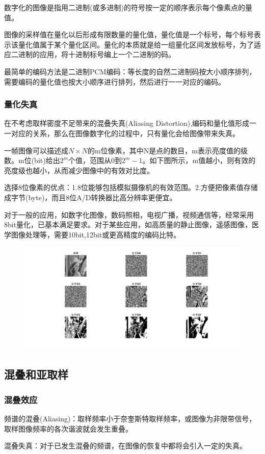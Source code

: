 \documentclass[11pt]{article}
\begin{document}
数字化的图像是指用二进制(或多进制)的符号按一定的顺序表示每个像素点的量值。

图像的采样值在量化以后形成有限数量的量化值，量化值是一个标号，每个标号表示该量化值属于某个量化区间。量化的本质就是给一组量化区间发放标号，为了适应二进制的应用，将十进制标号编上一个二进制的码。

最简单的编码方法是二进制PCM编码：等长度的自然二进制码按大小顺序排列，需要编码的量化值也按大小顺序进行排列，然后进行一一对应的编码。

\subsubsection{量化失真}

在不考虑取样密度不足带来的混叠失真(Aliasing Distortion),编码和量化值形成一一对应的关系，那么在图像数字化的过程中，只有量化会给图像带来失真。

一帧图像可以描述成$N\times N$的m位像素，其中N是点的数目，m表示亮度值的级数。m位(bit)给出$2^m$个值，范围从0到$2^m-1$。如下图所示，m值越小，则有效的亮度级也越小，从而减少图像中的有效对比度。

选择8位像素的优点：1.8位能够包括模拟摄像机的有效范围。2.方便把像素值存储成字节(byte)，而且8位A/D转换器比高分辨率更便宜。

对于一般的应用，如数字化图像，数码照相，电视广播，视频通信等，经常采用8bit量化，已基本满足要求。对于某些应用，如高质量的静止图像，遥感图像，医学图像处理等，需要10bit,12bit或更高精度的编码比特。
\begin{figure}[h]
	\centering
	\includegraphics[scale = 0.5]{图像的位分解}
\end{figure}

\subsection{混叠和亚取样}
\subsubsection{混叠效应}
频谱的混叠(Aliasing)：取样频率小于奈奎斯特取样频率，或图像为非限带信号，取样图像频率的各次谐波就会发生重叠。

混叠失真：对于已发生混叠的频谱，在图像的恢复中都将会引入一定的失真。
\end{document}
